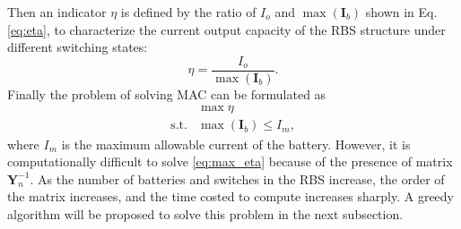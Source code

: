 \documentclass{article}
\begin{document}
Then an indicator $\eta$ is defined by the ratio of $I_o$ and $\max (\bm{I}_b)$ shown in Eq. \ref{eq:eta}, to characterize the current output capacity of the RBS structure under different switching states:
\begin{equation}\label{eq:eta}
    \eta = \frac{I_o}{\max (\bm{I}_b)}.
\end{equation}
Finally the problem of solving MAC can be formulated as
\begin{align}
    & \max \eta \label{eq:max_eta}\\
    \text{s.t.} & \max (\bm{I}_b) \leq I_m, \label{eq:Ib_leq_Im}
\end{align}
where $I_m$ is the maximum allowable current of the battery.
However, it is computationally difficult to solve \ref{eq:max_eta} because of the presence of matrix $\bm{Y}_n^{-1}$. %
As the number of batteries and switches in the RBS increase, the order of the matrix increases, and the time costed to compute increases sharply.
A greedy algorithm will be proposed to solve this problem in the next subsection. %

\end{document}
